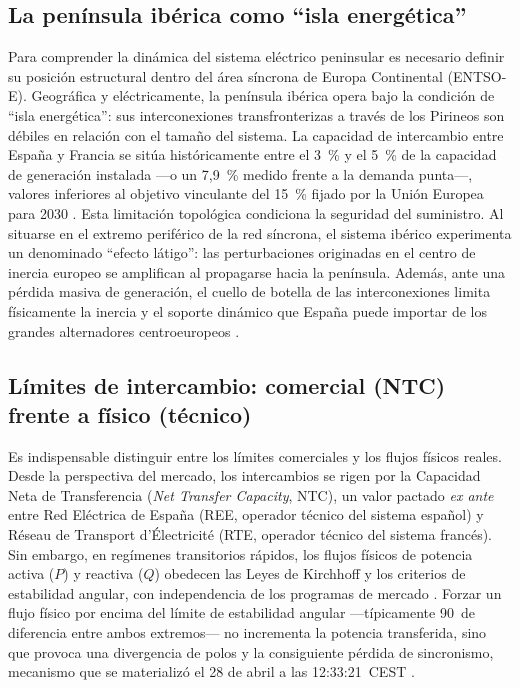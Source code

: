 \subsection{La península ibérica como ``isla energética''}

Para comprender la dinámica del sistema eléctrico peninsular es necesario
definir su posición estructural dentro del área síncrona de Europa
Continental (ENTSO-E). Geográfica y eléctricamente, la península ibérica
opera bajo la condición de ``isla energética'': sus interconexiones
transfronterizas a través de los Pirineos son débiles en relación con el
tamaño del sistema. La capacidad de intercambio entre España y Francia se
sitúa históricamente entre el 3~\% y el 5~\% de la capacidad de generación
instalada ---o un 7,9~\% medido frente a la demanda punta---, valores
inferiores al objetivo vinculante del 15~\% fijado por la Unión Europea
para 2030 \cite{mitceepr2025}. Esta limitación topológica condiciona la
seguridad del suministro. Al situarse en el extremo periférico de la red
síncrona, el sistema ibérico experimenta un denominado ``efecto látigo'':
las perturbaciones originadas en el centro de inercia europeo se amplifican
al propagarse hacia la península. Además, ante una pérdida masiva de
generación, el cuello de botella de las interconexiones limita físicamente
la inercia y el soporte dinámico que España puede importar de los grandes
alternadores centroeuropeos \cite{entsoe2025}.

\subsection{Límites de intercambio: comercial (NTC) frente a físico (técnico)}

Es indispensable distinguir entre los límites comerciales y los flujos físicos reales.
Desde la perspectiva del mercado, los intercambios se rigen por la Capacidad
Neta de Transferencia (\textit{Net Transfer Capacity}, NTC), un valor pactado
\textit{ex ante} entre Red Eléctrica de España (REE, operador técnico del sistema español) y Réseau de Transport d'Électricité (RTE, operador técnico del sistema francés). Sin embargo, en regímenes transitorios rápidos,
los flujos físicos de potencia activa ($P$) y reactiva ($Q$) obedecen las Leyes de
Kirchhoff y los criterios de estabilidad angular, con independencia de los
programas de mercado \cite{entsoe2025}. Forzar un flujo físico por encima del límite de estabilidad angular ---típicamente
90\textdegree\ de diferencia entre ambos extremos--- no incrementa la potencia
transferida, sino que provoca una divergencia de polos y la consiguiente pérdida
de sincronismo, mecanismo que se materializó el 28 de abril a las 12:33:21~CEST
\cite{ree2025}.

